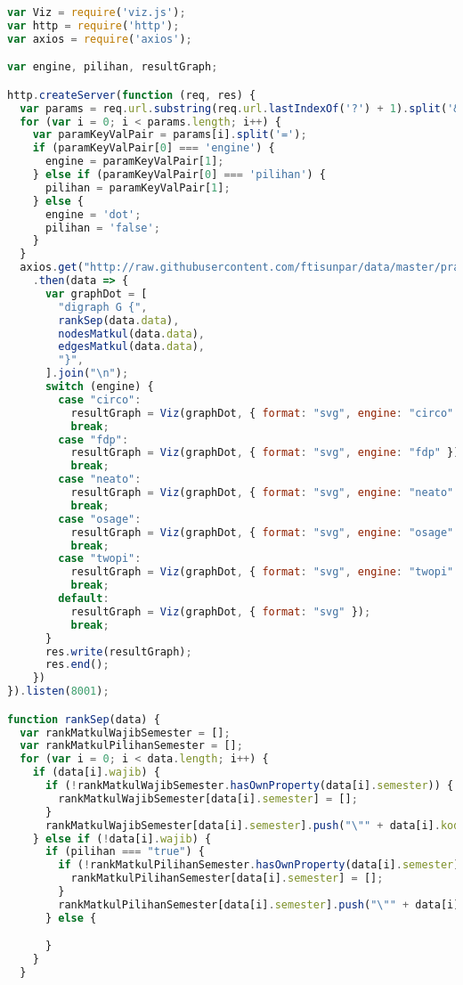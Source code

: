 \begin{lstlisting}[language=Javascript, caption=indexs.js]
var Viz = require('viz.js');
var http = require('http');
var axios = require('axios');

var engine, pilihan, resultGraph;

http.createServer(function (req, res) {
  var params = req.url.substring(req.url.lastIndexOf('?') + 1).split('&');
  for (var i = 0; i < params.length; i++) {
    var paramKeyValPair = params[i].split('=');
    if (paramKeyValPair[0] === 'engine') {
      engine = paramKeyValPair[1];
    } else if (paramKeyValPair[0] === 'pilihan') {
      pilihan = paramKeyValPair[1];
    } else {
      engine = 'dot';
      pilihan = 'false';
    }
  }
  axios.get("http://raw.githubusercontent.com/ftisunpar/data/master/prasyarat.json")
    .then(data => {
      var graphDot = [
        "digraph G {",
        rankSep(data.data),
        nodesMatkul(data.data),
        edgesMatkul(data.data),
        "}",
      ].join("\n");
      switch (engine) {
        case "circo":
          resultGraph = Viz(graphDot, { format: "svg", engine: "circo" });
          break;
        case "fdp":
          resultGraph = Viz(graphDot, { format: "svg", engine: "fdp" });
          break;
        case "neato":
          resultGraph = Viz(graphDot, { format: "svg", engine: "neato" });
          break;
        case "osage":
          resultGraph = Viz(graphDot, { format: "svg", engine: "osage" });
          break;
        case "twopi":
          resultGraph = Viz(graphDot, { format: "svg", engine: "twopi" });
          break;
        default:
          resultGraph = Viz(graphDot, { format: "svg" });
          break;
      }
      res.write(resultGraph);
      res.end();
    })
}).listen(8001);

function rankSep(data) {
  var rankMatkulWajibSemester = [];
  var rankMatkulPilihanSemester = [];
  for (var i = 0; i < data.length; i++) {
    if (data[i].wajib) {
      if (!rankMatkulWajibSemester.hasOwnProperty(data[i].semester)) {
        rankMatkulWajibSemester[data[i].semester] = [];
      }
      rankMatkulWajibSemester[data[i].semester].push("\"" + data[i].kode + "\"\;");
    } else if (!data[i].wajib) {
      if (pilihan === "true") {
        if (!rankMatkulPilihanSemester.hasOwnProperty(data[i].semester)) {
          rankMatkulPilihanSemester[data[i].semester] = [];
        }
        rankMatkulPilihanSemester[data[i].semester].push("\"" + data[i].kode + "\"\;");
      } else {

      }
    }
  }


\end{lstlisting}
